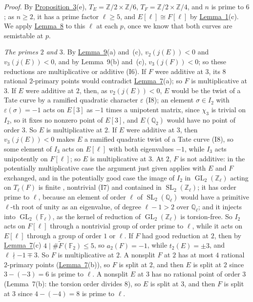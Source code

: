 \documentclass[11pt]{article}
\newcommand{\Q}{\mathbb Q}
\newcommand{\Z}{\mathbb Z}
\newcommand{\F}{\mathbb F}
\DeclareMathOperator{\GL}{GL}
\DeclareMathOperator{\SL}{SL}
\begin{document}
\emph{Proof.} By \hyperref[prop-parents]{Proposition~3}(e), \(T_E=\Z/2\times\Z/6\), \(T_F=\Z/2\times\Z/4\), and \(n\)
is prime to \(6\); as \(n\ge2\), it has a prime factor \(\ell\ge5\), and \(E[\ell]\cong F[\ell]\) by
\hyperref[lemma-gluing]{Lemma~1}(c). We apply \hyperref[lemma-compare]{Lemma~8} to this \(\ell\) at each \(p\), once
we know that both curves are semistable at \(p\).

\emph{The primes \(2\) and \(3\).} By \hyperref[lemma-hlp]{Lemma~9}(a) and~(c), \(v_2(j(E))<0\) and
\(v_3(j(E))<0\), and by Lemma~9(b) and~(c), \(v_3(j(F))<0\); so these reductions are multiplicative or additive (I6).
If \(F\) were additive at \(3\), its \(8\) rational \(2\)-primary points would contradict
\hyperref[lemma-localtorsion]{Lemma~7}(a); so \(F\) is multiplicative at \(3\). If \(E\) were additive at \(2\),
then, as \(v_2(j(E))<0\), \(E\) would be the twist of a Tate curve by a ramified quadratic character \(\varepsilon\)
(I8); an element \(\sigma\in I_2\) with \(\varepsilon(\sigma)=-1\) acts on \(E[3]\) as \(-1\) times a unipotent
matrix, since \(\chi_3\) is trivial on \(I_2\), so it fixes no nonzero point of \(E[3]\), and \(E(\Q_2)\) would have
no point of order \(3\). So \(E\) is multiplicative at \(2\). If \(E\) were additive at \(3\),
then \(v_3(j(E))<0\) makes \(E\) a ramified quadratic twist of a Tate curve (I8), so some element of \(I_3\) acts on
\(E[\ell]\) with both eigenvalues \(-1\), while \(I_3\) acts unipotently on \(F[\ell]\); so \(E\) is multiplicative
at \(3\). At \(2\), \(F\) is not additive: in the potentially multiplicative case the argument just given applies
with \(E\) and \(F\) exchanged, and in
the potentially good case the image of \(I_2\) in \(\GL_2(\Z_\ell)\) acting on \(T_\ell(F)\) is finite
\cite[Corollary~VII.7.3]{Si1}, nontrivial (I7) and contained in \(\SL_2(\Z_\ell)\); it has order prime to \(\ell\),
because an element of order \(\ell\) of \(\SL_2(\Q_\ell)\) would have a primitive \(\ell\)-th root of unity as an
eigenvalue, of degree \(\ell-1>2\) over \(\Q_\ell\); and it injects into \(\GL_2(\F_\ell)\), as the kernel of
reduction of \(\GL_2(\Z_\ell)\) is torsion-free. So \(I_2\) acts on \(F[\ell]\) through a nontrivial group of order
prime to \(\ell\), while it acts on \(E[\ell]\) through a group of order \(1\) or \(\ell\). If \(F\) had good reduction at \(2\),
then by \hyperref[lemma-localtorsion]{Lemma~7}(c) \(4\mid\#\widetilde F(\F_2)\le5\), so \(a_2(F)=-1\), while
\(t_2(E)=\pm3\), and \(\ell\nmid-1\mp3\). So \(F\) is multiplicative at \(2\). A nonsplit \(F\) at \(2\) has at most
\(4\) rational \(2\)-primary points (\hyperref[lemma-localtorsion]{Lemma~7}(b)), so \(F\) is split at \(2\), and
then \(E\) is split at \(2\) since \(3-(-3)=6\) is prime to \(\ell\). A nonsplit \(E\) at \(3\) has no rational point
of order \(3\) (Lemma~7(b): the torsion order divides \(8\)), so \(E\) is split at \(3\), and then \(F\) is split at
\(3\) since \(4-(-4)=8\) is prime to \(\ell\).
\end{document}
